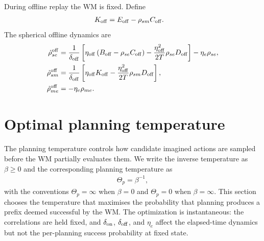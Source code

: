 \documentclass{article}
\begin{document}
During offline replay the WM is fixed. Define
\begin{align}
K_{\rm off} &= E_{\rm off}-\rho_{sm}C_{\rm off}.
\end{align}
The spherical offline dynamics are
\begin{align}
\dot\rho_{se}^{\rm off} &= \frac{1}{\delta_{\rm off}}\left[\eta_{\rm off}\left(B_{\rm off}-\rho_{se}C_{\rm off}\right)-\frac{\eta_{\rm off}^2}{2T}\rho_{se}D_{\rm off}\right]-\eta_e\rho_{se}, \\
\dot\rho_{sm}^{\rm off} &= \frac{1}{\delta_{\rm off}}\left[\eta_{\rm off}K_{\rm off}-\frac{\eta_{\rm off}^2}{2T}\rho_{sm}D_{\rm off}\right], \\
\dot\rho_{me}^{\rm off} &= -\eta_e\rho_{me}.
\end{align}
\section{Optimal planning temperature}

The planning temperature controls how candidate imagined actions are sampled before the WM partially evaluates them. We write the inverse temperature as $\beta\geq 0$ and the corresponding planning temperature as
\begin{align}
\Theta_p=\beta^{-1},
\end{align}
with the conventions $\Theta_p=\infty$ when $\beta=0$ and $\Theta_p=0$ when $\beta=\infty$. This section chooses the temperature that maximises the probability that planning produces a prefix deemed successful by the WM. The optimization is instantaneous: the correlations are held fixed, and $\delta_{\rm on}$, $\delta_{\rm off}$, and $\eta_e$ affect the elapsed-time dynamics but not the per-planning success probability at fixed state.
\end{document}
